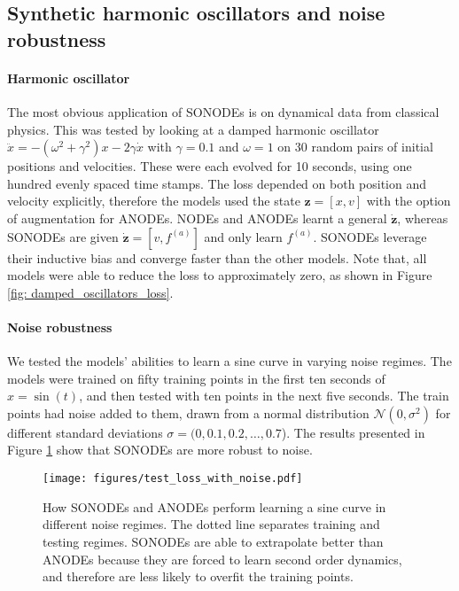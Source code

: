 \documentclass{article}
\theoremstyle{remark}
\theoremstyle{definition}
\begin{document}
\subsection{Synthetic harmonic oscillators and noise robustness} \label{sec:synthetic}

\paragraph{Harmonic oscillator} The most obvious application of SONODEs is on dynamical data from classical physics. This was tested by looking at a damped harmonic oscillator $\ddot{x} = -(\omega^{2}+\gamma^{2})x - 2\gamma\dot{x}$ with
$\gamma = 0.1$ and $\omega = 1$ on 30 random pairs of initial positions and velocities. These were each evolved for 10 seconds, using one hundred evenly spaced time stamps. The loss depended on both position and velocity explicitly, therefore the models used the state $\mathbf{z}=[x, v]$ with the option of augmentation for ANODEs. NODEs and ANODEs learnt a general $\dot{\mathbf{z}}$, whereas SONODEs are given $\dot{\mathbf{z}} = [v, f^{(a)}]$ and only learn $f^{(a)}$. SONODEs leverage their inductive bias and converge faster than the other models. Note that, all models were able to reduce the loss to approximately zero, as shown in Figure \ref{fig: damped_oscillators_loss}.

\paragraph{Noise robustness} We tested the models' abilities to learn a sine curve in varying noise regimes. The models were trained on fifty training points in the first ten seconds of $x=\sin(t)$, and then tested with ten points in the next five seconds. The train points had noise added to them, drawn from a normal distribution $\mathcal{N}(0,\sigma^2)$ for different standard deviations $\sigma = (0,0.1,0.2,\dots, 0.7$). The results presented in Figure \ref{fig: noise_robustness} show that SONODEs are more robust to noise. 

\begin{figure}[h]
    \centering
    \texttt{[image: figures/test\_loss\_with\_noise.pdf]}
    \vspace{-10pt}
    \caption{How SONODEs and ANODEs perform learning a sine curve in different noise regimes. The dotted line separates training and testing regimes. SONODEs are able to extrapolate better than ANODEs because they are forced to learn second order dynamics, and therefore are less likely to overfit the training points.}
    \label{fig: noise_robustness}
\end{figure}
\end{document}
